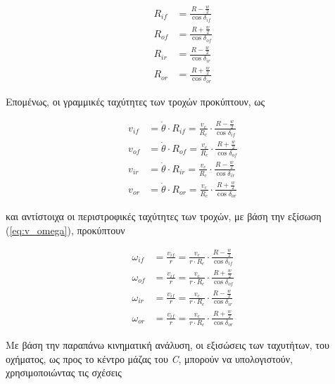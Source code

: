 {\begin{align}
	R_{if} &= \frac{R - \frac{w}{2}}{\cos{\delta_{if}}}
	\label{eq:neg_4ws_rif}\\
	R_{of} &= \frac{R + \frac{w}{2}}{\cos{\delta_{of}}}
	\label{eq:neg_4ws_rof}\\
	R_{ir} &= \frac{R - \frac{w}{2}}{\cos{\delta_{ir}}}
	\label{eq:neg_4ws_rir}\\
	R_{or} &= \frac{R + \frac{w}{2}}{\cos{\delta_{or}}}
	\label{eq:neg_4ws_or}
\end{align}

\bigskip
Επομένως, οι γραμμικές ταχύτητες των τροχών προκύπτουν, ως

\begin{align}
	\label{eq:neg_4ws_vif}	
	v_{if} &= \dot\theta \cdot R_{if} = \frac{v_c}{R_c} \cdot \frac{R - \frac{w}{2}}{\cos{\delta_{if}}}\\
	\label{eq:neg_4ws_vof}	
	v_{of} &= \dot\theta \cdot R_{of} = \frac{v_c}{R_c} \cdot \frac{R + \frac{w}{2}}{\cos{\delta_{of}}}\\
	\label{eq:neg_4ws_vir}	
	v_{ir} &= \dot\theta \cdot R_{ir} = \frac{v_c}{R_c} \cdot \frac{R - \frac{w}{2}}{\cos{\delta_{ir}}} \\
	\label{eq:neg_4ws_vor}
	v_{or} &= \dot\theta \cdot R_{or} = \frac{v_c}{R_c} \cdot \frac{R + \frac{w}{2}}{\cos{\delta_{or}}}
\end{align}

\bigskip
\noindent
και αντίστοιχα οι περιστροφικές ταχύτητες των τροχών, με βάση την εξίσωση (\ref{eq:v_omega}), προκύπτουν

\begin{align}
	\label{eq:neg_4ws_wif}	
	\omega_{if} &= \frac{v_{if}}{r} = \frac{v_c}{r \cdot R_c} \cdot \frac{R - \frac{w}{2}}{\cos{\delta_{if}}}\\
	\label{eq:neg_4ws_wof}	
	\omega_{of} &= \frac{v_{if}}{r} = \frac{v_c}{r \cdot R_c} \cdot \frac{R + \frac{w}{2}}{\cos{\delta_{of}}}\\
	\label{eq:neg_4ws_wir}	
	\omega_{ir} &= \frac{v_{if}}{r} = \frac{v_c}{r \cdot R_c} \cdot \frac{R - \frac{w}{2}}{\cos{\delta_{ir}}} \\
	\label{eq:neg_4ws_wor}
	\omega_{or} &= \frac{v_{if}}{r} = \frac{v_c}{r \cdot R_c} \cdot \frac{R + \frac{w}{2}}{\cos{\delta_{or}}}
\end{align} 

\bigskip
Με βάση την παραπάνω κινηματική ανάλυση, οι εξισώσεις των ταχυτήτων, του οχήματος, ως προς το κέντρο μάζας του \textit{C}, μπορούν να υπολογιστούν, χρησιμοποιώντας τις σχέσεις

}

